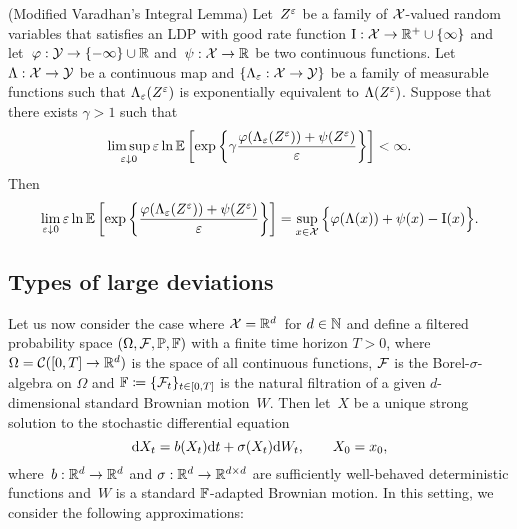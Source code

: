 \begin{theorem}(Modified Varadhan's Integral Lemma)\label{thm:varadhan_modified} %
\sloppy Let~$Z^{\varepsilon}$ be a family of $\mathcal{X}$\nobreakdash-valued random variables that satisfies an LDP with good rate function ${\mathrm{I}:\mathcal{X}\rightarrow \mathbb{R}^+ \cup \{\infty\}}$ and let~${\varphi: \mathcal{Y} \to \{-\infty\} \cup \mathbb{R}}$ and~${\psi: \mathcal{X} \rightarrow \mathbb{R}}$  be two continuous functions. Let~${\Lambda: \mathcal{X} \rightarrow \mathcal{Y}}$ be a continuous map and $\{\Lambda_{\varepsilon} : \mathcal{X} \to \mathcal{Y}\}$ be a family of measurable functions such that $\Lambda_{\varepsilon}(Z^{\varepsilon})$ is exponentially equivalent to $\Lambda(Z^{\varepsilon})$. Suppose that there exists $\gamma > 1$ such that
$$
\limsup\limits_{\varepsilon \downarrow 0}
\varepsilon\ln \mathbb{E}\left[\exp\left\{\gamma \frac{\varphi(\Lambda_{\varepsilon}(Z^{\varepsilon})) + \psi(Z^{\varepsilon})}{\varepsilon}\right\}\right]< \infty.
$$
Then
$$
\lim_{\varepsilon \downarrow 0}
\varepsilon\ln \mathbb{E}\left[\exp\left\{\frac{\varphi(\Lambda_{\varepsilon}(Z^{\varepsilon})) + \psi(Z^{\varepsilon})}{\varepsilon}\right\}\right]
= \sup\limits_{x \in \mathcal{X}} \Big\{\varphi(\Lambda(x)) + \psi(x) - \mathrm{I}(x) \Big\}.
$$
\end{theorem}


\subsection{Types of large deviations}
Let us now consider the case where $\mathcal{X} = \mathbb{R}^d\,$ for $d\in\mathbb{N}$ and define a filtered probability space $(\Omega, \mathcal{F}, \mathbb{P}, \mathbb{F})$ with a finite time horizon $T>0$, where $\Omega = \mathcal{C}([0,T]\to \mathbb{R}^d)$ is the space of all continuous functions, $\mathcal{F}$ is the Borel-$\sigma$-algebra on $\Omega$ and $\mathbb{F}\coloneqq\{\mathcal{F}_t\}_{t\in[0,T]}$ is the natural filtration of a given $d$-dimensional standard Brownian motion~$W$. Then let~$X$ be a unique strong solution to the stochastic differential equation
\begin{equation}\label{eq:genericSDE}
\mathrm{d} X_t = b(X_t) \mathrm{d} t + \sigma(X_t) \mathrm{d} W_t, \qquad X_0 = x_0,
\end{equation}
where~$b:\mathbb{R}^d\to \mathbb{R}^d$ and $\sigma:\mathbb{R}^d \to \mathbb{R}^{d\times d}$ are sufficiently well-behaved
deterministic functions and~$W$ is a standard $\mathbb{F}$-adapted Brownian motion. In this setting, we consider the following approximations:

